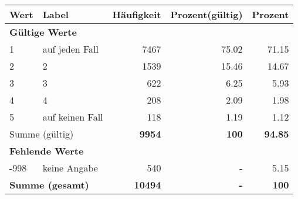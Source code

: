      \begin{longtable}{lXrrr}
     \toprule
     \textbf{Wert} & \textbf{Label} & \textbf{Häufigkeit} & \textbf{Prozent(gültig)} & \textbf{Prozent} \\
     \endhead
     \midrule
     \multicolumn{5}{l}{\textbf{Gültige Werte}}\\

     1 &
     \multicolumn{1}{X}{ auf jeden Fall   } &


       \num{7467} &
       \num[round-mode=places,round-precision=2]{75,02} &
         \num[round-mode=places,round-precision=2]{71,15} \\

     2 &
     \multicolumn{1}{X}{ 2   } &


       \num{1539} &
       \num[round-mode=places,round-precision=2]{15,46} &
         \num[round-mode=places,round-precision=2]{14,67} \\

     3 &
     \multicolumn{1}{X}{ 3   } &


       \num{622} &
       \num[round-mode=places,round-precision=2]{6,25} &
         \num[round-mode=places,round-precision=2]{5,93} \\

     4 &
     \multicolumn{1}{X}{ 4   } &


       \num{208} &
       \num[round-mode=places,round-precision=2]{2,09} &
         \num[round-mode=places,round-precision=2]{1,98} \\

     5 &
     \multicolumn{1}{X}{ auf keinen Fall   } &


       \num{118} &
       \num[round-mode=places,round-precision=2]{1,19} &
         \num[round-mode=places,round-precision=2]{1,12} \\
     \midrule
     \multicolumn{2}{l}{Summe (gültig)} &
       \textbf{\num{9954}} &
     \textbf{100} &
       \textbf{\num[round-mode=places,round-precision=2]{94,85}} \\
     \multicolumn{5}{l}{\textbf{Fehlende Werte}}\\
       -998 &
       keine Angabe &
         \num{540} &
        - &
         \num[round-mode=places,round-precision=2]{5,15} \\
     \midrule
     \multicolumn{2}{l}{\textbf{Summe (gesamt)}} &
          \textbf{\num{10494}} &
        \textbf{-} &
        \textbf{100} \\
     \bottomrule
     \end{longtable}
     
